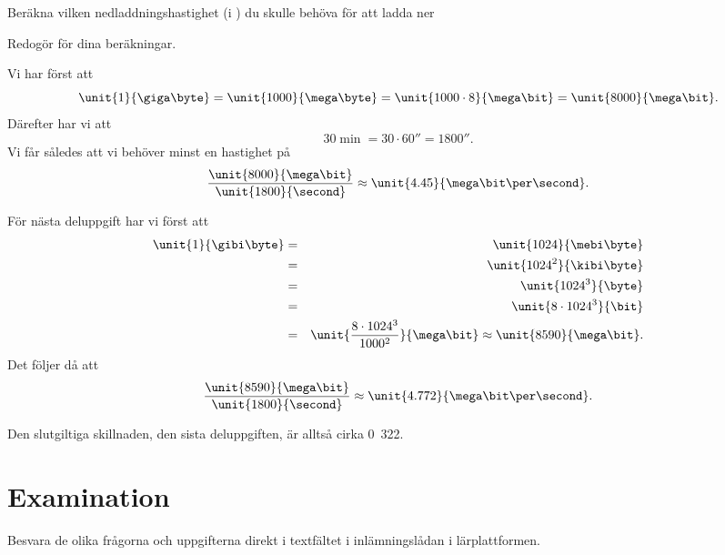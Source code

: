 \documentclass[a4paper,nocourse]{miunasgn}
\begin{document}
\begin{questions}
\question
Beräkna vilken nedladdningshastighet (i \mega\bit\per\second) du skulle behöva 
för att ladda
ner

Redogör för dina beräkningar.
\begin{solution}
	Vi har först att \[
		\unit{1}{\giga\byte} = \unit{1000}{\mega\byte} =
		\unit{1000\cdot 8}{\mega\bit} = \unit{8000}{\mega\bit}.
	\]
	Därefter har vi att \[
		\unit{30}{\min} = \unit{30\cdot 60}{\second} =
		\unit{1800}{\second}.
	\]
	Vi får således att vi behöver minst en hastighet på \[
		\frac{\unit{8000}{\mega\bit}}{\unit{1800}{\second}} \approx
		\unit{4.45}{\mega\bit\per\second}.
	\]

	För nästa deluppgift har vi först att
	\begin{eqnarray*}
		\unit{1}{\gibi\byte} &=& \unit{1024}{\mebi\byte} \\
			&=& \unit{1024^2}{\kibi\byte} \\
			&=& \unit{1024^3}{\byte} \\
			&=& \unit{8\cdot 1024^3}{\bit} \\
			&=& \unit{\frac{8\cdot 1024^3}{1000^2}}{\mega\bit} \approx 
			\unit{8590}{\mega\bit}.
	\end{eqnarray*}
	Det följer då att \[
		\frac{\unit{8590}{\mega\bit}}{\unit{1800}{\second}} \approx
		\unit{4.772}{\mega\bit\per\second}.
	\]

	Den slutgiltiga skillnaden, den sista deluppgiften, är alltså cirka 
	\unit{0.322}{\mega\bit\per\second}.
\end{solution}

\end{questions}


\section{Examination}
\label{sec:Examination}
\noindent
Besvara de olika frågorna och uppgifterna direkt i textfältet i inlämningslådan 
i lärplattformen.



\end{document}
